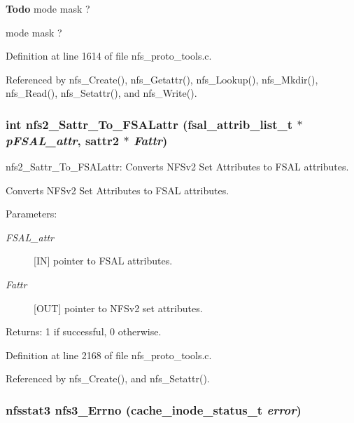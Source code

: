 \begin{Desc}
\item[{\bf Todo}]mode mask ? 

mode mask ?\end{Desc}


Definition at line 1614 of file nfs\_\-proto\_\-tools.c.

Referenced by nfs\_\-Create(), nfs\_\-Getattr(), nfs\_\-Lookup(), nfs\_\-Mkdir(), nfs\_\-Read(), nfs\_\-Setattr(), and nfs\_\-Write().
\subsubsection{\setlength{\rightskip}{0pt plus 5cm}int nfs2\_\-Sattr\_\-To\_\-FSALattr (fsal\_\-attrib\_\-list\_\-t $\ast$ {\em p\-FSAL\_\-attr}, sattr2 $\ast$ {\em Fattr})}\label{nfs__proto__tools_8c_a19}


nfs2\_\-Sattr\_\-To\_\-FSALattr: Converts NFSv2 Set Attributes to FSAL attributes.

Converts NFSv2 Set Attributes to FSAL attributes.

\begin{Desc}
\item[Parameters:]
\begin{description}
\item[{\em FSAL\_\-attr}][IN] pointer to FSAL attributes. \item[{\em Fattr}][OUT] pointer to NFSv2 set attributes.\end{description}
\end{Desc}
\begin{Desc}
\item[Returns:]1 if successful, 0 otherwise. \end{Desc}


Definition at line 2168 of file nfs\_\-proto\_\-tools.c.

Referenced by nfs\_\-Create(), and nfs\_\-Setattr().
\subsubsection{\setlength{\rightskip}{0pt plus 5cm}nfsstat3 nfs3\_\-Errno (cache\_\-inode\_\-status\_\-t {\em error})}\label{nfs__proto__tools_8c_a27}


